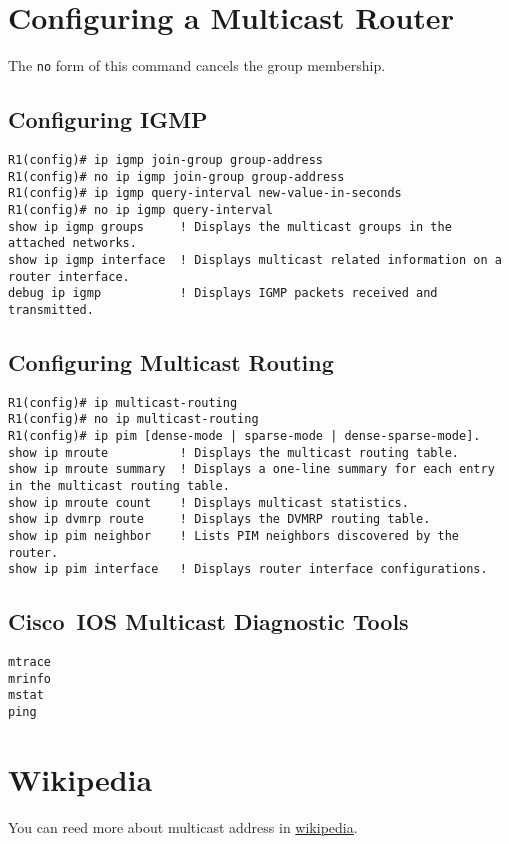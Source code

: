 \documentclass{../UTNetLab}
\begin{document}
\begin{appendices}

\section{Configuring a Multicast Router}
    The \lstinline[language={cisco}]{no} form of this command cancels the group membership.
    \begin{subappendices}
\subsection{Configuring IGMP}
    \begin{lstlisting}[language={cisco}, emph={group-address, new-value-in-seconds}]
R1(config)# ip igmp join-group group-address
R1(config)# no ip igmp join-group group-address
R1(config)# ip igmp query-interval new-value-in-seconds
R1(config)# no ip igmp query-interval
show ip igmp groups     ! Displays the multicast groups in the attached networks.
show ip igmp interface  ! Displays multicast related information on a router interface.
debug ip igmp           ! Displays IGMP packets received and transmitted.
    \end{lstlisting}

\subsection{Configuring Multicast Routing}
    \begin{lstlisting}[language={cisco}]
R1(config)# ip multicast-routing
R1(config)# no ip multicast-routing
R1(config)# ip pim [dense-mode | sparse-mode | dense-sparse-mode].
show ip mroute          ! Displays the multicast routing table.
show ip mroute summary  ! Displays a one-line summary for each entry in the multicast routing table.
show ip mroute count    ! Displays multicast statistics.
show ip dvmrp route     ! Displays the DVMRP routing table.
show ip pim neighbor    ! Lists PIM neighbors discovered by the router.
show ip pim interface   ! Displays router interface configurations.
    \end{lstlisting}

\subsection{Cisco~IOS Multicast Diagnostic Tools}
\begin{lstlisting}[language={cisco}]
mtrace
mrinfo
mstat
ping
\end{lstlisting}
    
\end{subappendices}

\section{Wikipedia}
    You can reed more about multicast address in \href{https://en.wikipedia.org/wiki/Multicast_address}{wikipedia}.

\end{appendices}
\end{document}
